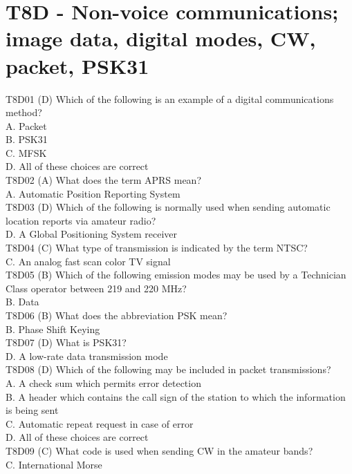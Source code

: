 \documentclass[12pt,letterpaper]{report}
\begin{document}
\section{T8D - Non-voice communications; image data, digital modes, CW, packet, PSK31}

T8D01 (D) Which of the following is an example of a digital communications method?\\
A. Packet\\
B. PSK31\\
C. MFSK\\
D. All of these choices are correct\\

T8D02 (A) What does the term APRS mean?\\
A. Automatic Position Reporting System\\

T8D03 (D) Which of the following is normally used when sending automatic location reports via amateur radio?\\
D. A Global Positioning System receiver\\

T8D04 (C) What type of transmission is indicated by the term NTSC?\\
C. An analog fast scan color TV signal\\

T8D05 (B) Which of the following emission modes may be used by a Technician Class operator between 219 and 220 MHz?\\
B. Data\\

T8D06 (B) What does the abbreviation PSK mean?\\
B. Phase Shift Keying\\

T8D07 (D) What is PSK31?\\
D. A low-rate data transmission mode \\

T8D08 (D) Which of the following may be included in packet transmissions?\\
A. A check sum which permits error detection\\
B. A header which contains the call sign of the station to which the information is being sent\\
C. Automatic repeat request in case of error\\
D. All of these choices are correct\\ 

T8D09 (C) What code is used when sending CW in the amateur bands?\\
C. International Morse\\
\end{document}
